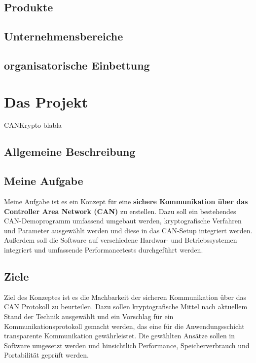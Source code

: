 \subsection{Produkte}
\subsection{Unternehmensbereiche}
\subsection{organisatorische Einbettung} %
\section{Das Projekt}
CANKrypto blabla
\subsection{Allgemeine Beschreibung}
\subsection{Meine Aufgabe} %
Meine Aufgabe ist es ein Konzept für eine \textbf{sichere Kommunikation über das Controller Area Network (CAN)} zu erstellen. Dazu soll ein bestehendes CAN-Demoprogramm umfassend umgebaut werden, kryptografische Verfahren und Parameter ausgewählt werden und diese in das CAN-Setup integriert werden. Außerdem soll die Software auf verschiedene Hardwar- und Betriebssystemen integriert und umfassende Performancetests durchgeführt werden. 

\subsection{Ziele}
Ziel des Konzeptes ist es die Machbarkeit der sicheren Kommunikation über das CAN Protokoll zu beurteilen. Dazu sollen kryptografische Mittel nach aktuellem Stand der Technik ausgewählt und ein Vorschlag für ein Kommunikationsprotokoll gemacht werden, das eine für die Anwendungsschicht transparente Kommunikation gewährleistet. Die gewählten Ansätze sollen in Software umgesetzt werden und hinsichtlich Performance, Speicherverbrauch und Portabilität geprüft werden. 


